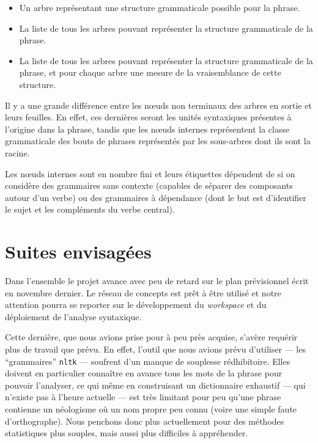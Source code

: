 \documentclass[a4paper, 12pt]{article}
\newcommand{\pyt}[1]{\texttt{#1}}%
\begin{document}
\begin{itemize}
	\item Un arbre représentant une structure grammaticale possible pour la phrase.
	\item La liste de tous les arbres pouvant représenter la structure grammaticale de la phrase.
	\item La liste de tous les arbres pouvant représenter la structure grammaticale de la phrase, et pour chaque arbre une mesure de la vraisemblance de cette structure.
\end{itemize}

Il y a une grande différence entre les n\oe{}uds non terminaux des arbres en sortie et leurs feuilles. En effet, ces dernières seront les unités syntaxiques présentes à l'origine dans la phrase, tandis que les n\oe{}uds internes représentent la classe grammaticale des bouts de phrases représentés par les sous-arbres dont ils sont la racine.


Les n\oe{}uds internes sont en nombre fini et leurs étiquettes dépendent de si on considère des grammaires sans contexte (capables de séparer des composants autour d'un verbe) ou des grammaires à dépendance (dont le but est d'identifier le sujet et les compléments du verbe central).


\section{Suites envisagées}

Dans l'ensemble le projet avance avec peu de retard sur le plan prévisionnel écrit en novembre dernier. Le réseau de concepts est prêt à être utilisé et notre attention pourra se reporter sur le développement du \textit{workspace} et du déploiement de l'analyse syntaxique.

Cette dernière, que nous avions prise pour à peu près acquise, s'avère requérir plus de travail que prévu. En effet, l'outil que nous avions prévu d'utiliser --- les ``grammaires'' \pyt{nltk} --- soufrent d'un manque de souplesse rédhibitoire. Elles doivent en particulier connaître en avance tous les mots de la phrase pour pouvoir l'analyser, ce qui même en construisant un dictionnaire exhaustif --- qui n'existe pas à l'heure actuelle --- est très limitant pour peu qu'une phrase contienne un néologisme où un nom propre peu connu (voire une simple faute d'orthographe). Nous penchons donc plus actuellement pour des méthodes statistiques plus souples, mais aussi plus difficiles à appréhender.
\end{document}
